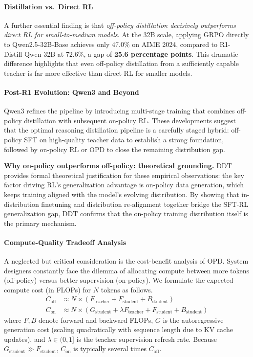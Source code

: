 \documentclass{article} %
\begin{document}
\paragraph{Distillation vs.\ Direct RL}
A further essential finding is that \emph{off-policy distillation decisively outperforms direct RL for small-to-medium models}. At the 32B scale, applying GRPO directly to Qwen2.5-32B-Base achieves only 47.0\% on AIME 2024, compared to R1-Distill-Qwen-32B at 72.6\%, a gap of \textbf{25.6 percentage points}. This dramatic difference highlights that even off-policy distillation from a sufficiently capable teacher is far more effective than direct RL for smaller models.

\paragraph{Post-R1 Evolution: Qwen3 and Beyond}
Qwen3 \citep{2505.09388} refines the pipeline by introducing multi-stage training that combines off-policy distillation with subsequent on-policy RL. These developments suggest that the optimal reasoning distillation pipeline is a carefully staged hybrid: off-policy SFT on high-quality teacher data to establish a strong foundation, followed by on-policy RL or OPD to close the remaining distribution gap.

\textbf{Why on-policy outperforms off-policy: theoretical grounding.}
DDT~\citep{2602.12222} provides formal theoretical justification for these empirical observations: the key factor driving RL's generalization advantage is on-policy data generation, which keeps training aligned with the model's evolving distribution. By showing that in-distribution finetuning and distribution re-alignment together bridge the SFT-RL generalization gap, DDT confirms that the on-policy training distribution itself is the primary mechanism.

\paragraph{Compute-Quality Tradeoff Analysis}
A neglected but critical consideration is the cost-benefit analysis of OPD. System designers constantly face the dilemma of allocating compute between more tokens (off-policy) versus better supervision (on-policy). We formulate the expected compute cost (in FLOPs) for $N$ tokens as follows.
\begin{align}
C_{\text{off}} &\approx N \times (F_{\text{teacher}} + F_{\text{student}} + B_{\text{student}}) \\
C_{\text{on}} &\approx N \times \left( G_{\text{student}} + \lambda F_{\text{teacher}} + F_{\text{student}} + B_{\text{student}} \right)
\end{align}
where $F, B$ denote forward and backward FLOPs, $G$ is the autoregressive generation cost (scaling quadratically with sequence length due to KV cache updates), and $\lambda \in (0, 1]$ is the teacher supervision refresh rate. Because $G_{\text{student}} \gg F_{\text{student}}$, $C_{\text{on}}$ is typically several times $C_{\text{off}}$.
\end{document}
